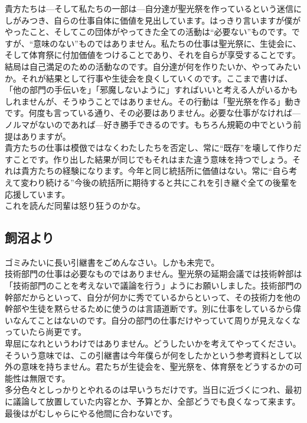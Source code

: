 \documentclass[dvipdfmx,jb5]{jarticle}
\begin{document}
 貴方たちは---そして私たちの一部は---自分達が聖光祭を作っているという迷信にしがみつき、自らの仕事自体に価値を見出しています。はっきり言いますが僕がやったこと、そしてこの団体がやってきた全ての活動は``必要ない''ものです。ですが、``意味のない''ものではありません。私たちの仕事は聖光祭に、生徒会に、そして体育祭に付加価値をつけることであり、それを自らが享受することです。
 \\

 結局は自己満足のための活動なのです。自分達が何を作りたいか、やってみたいか。それが結果として行事や生徒会を良くしていくのです。ここまで書けば、「他の部門の手伝いを」「邪魔しないように」すればいいと考える人がいるかもしれませんが、そうゆうことではありません。その行動は「聖光祭を作る」動きです。何度も言っている通り、その必要はありません。必要な仕事がなければ---ノルマがないのであれば---好き勝手できるのです。もちろん規範の中でという前提はありますが。
 \\

 貴方たちの仕事は模倣ではなくわたしたちを否定し、常に``既存''を壊して作りだすことです。作り出した結果が同じでもそれはまた違う意味を持つでしょう。それは貴方たちの経験になります。今年と同じ統括所に価値はない。常に``自ら考えて変わり続ける''今後の統括所に期待すると共にこれを引き継ぐ全ての後輩を応援しています。
 \\

 これを読んだ同輩は怒り狂うのかな。
\subsection{飼沼より}
ゴミみたいに長い引継書をごめんなさい。しかも未完で。
\\

技術部門の仕事は必要なものではありません。聖光祭の延期会議では技術幹部は「技術部門のことを考えないで議論を行う」ようにお願いしました。技術部門の幹部だからといって、自分が何かに秀でているからといって、その技術力を他の幹部や生徒を黙らせるために使うのは言語道断です。別に仕事をしているから偉いなんてことはないのです。自分の部門の仕事だけやっていて周りが見えなくなっていたら尚更です。
\\

卑屈になれというわけではありません。どうしたいかを考えてやってください。そういう意味では、この引継書は今年僕らが何をしたかという参考資料として以外の意味を持ちません。君たちが生徒会を、聖光祭を、体育祭をどうするかの可能性は無限です。
\\

多分色々としっかりとやれるのは早いうちだけです。当日に近づくにつれ、最初に議論して放置していた内容とか、予算とか、全部どうでも良くなって来ます。最後はがむしゃらにやる他間に合わないです。
\\
\end{document}
